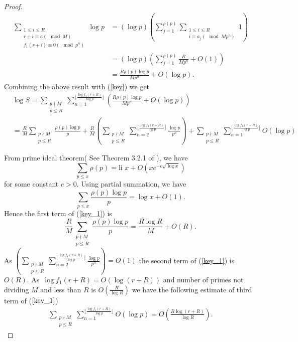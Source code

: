 \documentclass{amsart}
\newtheorem{Lemma 1}{Lemma}[section]
\newtheorem{Lemma 3}[Lemma 1]{Lemma}
\newtheorem{Lucas The}[Lemma 1]{Theorem}
\newtheorem{lem 1}[Lemma 1]{Lemma}
\newtheorem{Corollary 1}[Lemma 1]{Corollary}
\newtheorem{Corollary 2}[Lemma 1]{Corollary}
\begin{document}
\begin{proof}
		\begin{align*}\sum_{\substack{1\leq i \leq R\\r+i \equiv a(\mod M)\\f_1(r+i)\equiv 0(\mod p^n)}}\log p&=(\log p)\left(\sum_{j=1}^{\rho(p)}\sum_{\substack{1\leq i \leq R\\i \equiv a_j(\mod Mp^n) }}1\right)\\&=(\log p)\left( \sum_{j=1}^{\rho(p)}\frac{R}{Mp^n}+O(1)\right)\\&=\frac{R\rho(p)\log p }{Mp^n}+O(\log p).\end{align*}Combining the above result with (\ref{key}) we get \begin{align}&\log S=\sum_{\substack{p\nmid M\\p\leq R}}\sum_{n=1}^{\lfloor \frac{\log f_1(r+R)}{\log p} \rfloor}\left(\frac{R\rho(p)\log p }{Mp^n}+O(\log p)\right)\\&=\frac{R}{M}\sum_{\substack{p\nmid M\\p \leq R}}\frac{\rho(p)\log p}{p}+\frac{R}{M}\left(\sum_{\substack{p\nmid M\\p\leq R}}\sum_{n=2}^{\lfloor \frac{\log f_1(r+R)}{\log p} \rfloor} \frac{\log p}{p^n}\right)+\sum_{\substack{p\nmid M\\p\leq R}}\sum_{n=1}^{\lfloor \frac{\log f_1(r+R)}{\log p} \rfloor}O(\log p)\label{key_1}\end{align}
		
		From prime ideal theorem( See Theorem 3.2.1 of \cite{E}), we have\[ \sum_{p\leq x}\rho(p)=\text{li } x+O(xe^{-c\sqrt{\log x}})\] for some constant $c>0$. Using partial summation, we have \[ \sum_{p\leq x}\frac{\rho(p)\log p}{p}=\log x+O(1).\]Hence the first term of (\ref{key_1}) is\[\frac{R}{M}\sum_{\substack{p\nmid M\\p\leq R}}\frac{\rho(p)\log p }{p}=\frac{R\log R}{M}+O(R).\]As $\left(\sum_{\substack{p\nmid M\\p\leq R}}\sum_{n=2}^{\lfloor \frac{\log f_1(r+R)}{\log p} \rfloor} \frac{\log p}{p^n}\right)=O(1)$ the second term of (\ref{key_1}) is $O(R)$. As $\log f_1(r+R)=O(\log (r+R))$ and number of primes not dividing $M$ and less than $R$ is $O(\frac{R}{\log R})$ we have the following estimate of third term of ($\ref{key_1}$)\begin{align*}\sum_{\substack{p\nmid M\\p\leq R}}\sum_{n=1}^{\lfloor \frac{\log f_1(r+R)}{\log p} \rfloor}O(\log p)=O\left(\frac{R\log (r+R)}{\log R}\right).\end{align*}
		

\end{proof}
\end{document}
